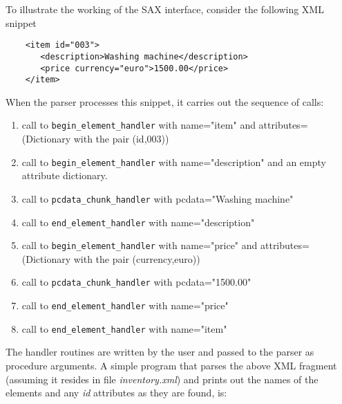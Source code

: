 \documentclass[11pt]{article}
\begin{document}
To illustrate the working of the SAX interface, consider the following
XML snippet

\begin{verbatim}
	<item id="003">                                                
	   <description>Washing machine</description>  
	   <price currency="euro">1500.00</price>  
	</item>                                                            
\end{verbatim}
%
When the parser processes this snippet, it carries out the sequence of calls:

\begin{enumerate}
\item call to \texttt{begin\_element\_handler} with name="item" and 
    attributes=(Dictionary with the pair (id,003))
\item call to \texttt{begin\_element\_handler} with name="description" and an
    empty attribute dictionary. 
\item  call to \texttt{pcdata\_chunk\_handler} with pcdata="Washing machine"
\item call to \texttt{end\_element\_handler} with name="description"
\item call to \texttt{begin\_element\_handler} with name="price" and 
    attributes=(Dictionary with the pair (currency,euro))
\item  call to \texttt{pcdata\_chunk\_handler} with pcdata="1500.00"
\item call to \texttt{end\_element\_handler} with name="price"
\item call to \texttt{end\_element\_handler} with name="item"
\end{enumerate}
	
The handler routines are written by the user and passed to the parser
as procedure arguments. A simple program that parses the above XML
fragment (assuming it resides in file \textsl{inventory.xml}) and
prints out the names of the elements and any \textsl{id} attributes as
they are found, is:
\end{document}

